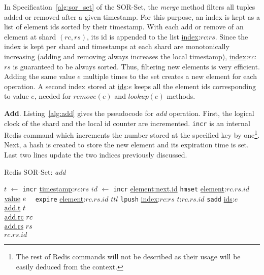 In Specification~\ref{alg:sor_set} of the SOR-Set, the \textit{merge} method
filters all tuples added or removed after a given timestamp. For this purpose,
an index is kept as a list of element ids sorted by their timestamp. With each
add or remove of an element at shard $(rc, rs)$, its id is appended to the list
\underline{index}:$rc$:$rs$. Since the index is kept per shard and timestamps at
each shard are monotonically increasing (adding and removing always increases
the local timestamp), \underline{index}:$rc$:$rs$ is guaranteed to be always
sorted. Thus, filtering new elements is very efficient. Adding the same
value $e$ multiple times to the set creates a new element for each operation. A
second index stored at \underline{ids}:$e$ keeps all the element ids
corresponding to value $e$, needed for $\textit{remove}(e)$ and
$\textit{lookup}(e)$ methods.

\textbf{Add}. Listing~\ref{alg:add} gives the pseudocode for \textit{add}
operation. First, the logical clock of the shard and the local id counter are
incremented. \texttt{incr} is an internal Redis command which increments the
number stored at the specified key by one\footnote{The rest of Redis commands will not be
described as their usage will be easily deduced from the context.}. Next, a
hash is created to store the new element and its expiration time is set. Last
two lines update the two indices previously discussed.

\begin{algorithm}[t]
    \small{
    \caption{Redis SOR-Set: \textit{add}}
    \label{alg:add}
    \centering
    \begin{algorithmic}[1]
 	    \State $t$ $\gets$ \texttt{incr} \underline{timestamp}:$rc$:$rs$
 	    \State $id$ $\gets$ \texttt{incr} \underline{element:next.id}
 	    \State \texttt{hmset} \underline{element}:$rc.rs.id$ $\begin{aligned}[t]
                                                               & \text{\underline{value} } e \\[-2pt]
                                                               & \text{\underline{add.t} } t \\[-2pt]
                                                               & \text{\underline{add.rc} } rc \\[-2pt]
                                                               & \text{\underline{add.rs} } rs
                                                              \end{aligned}$
        \State \texttt{expire} \underline{element}:$rc.rs.id$ $ttl$
        \State \texttt{lpush} \underline{index}:$rc$:$rs$ $t$:$rc.rs.id$
        \State \texttt{sadd} \underline{ids}:$e$ $rc.rs.id$
 	  \EndProcedure
	\end{algorithmic}
    }
\end{algorithm}

